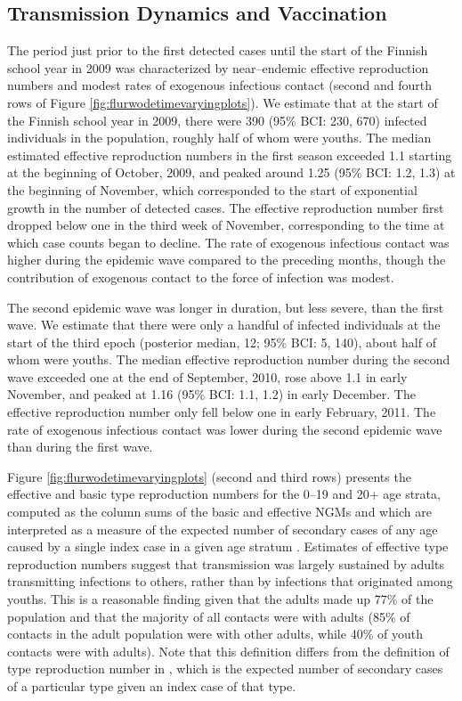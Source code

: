 \subsection{Transmission Dynamics and Vaccination}
\label{flu_res_dynamics}

The period just prior to the first detected cases until the start of the Finnish school year in 2009 was characterized by near--endemic effective reproduction numbers and modest rates of exogenous infectious contact (second and fourth rows of Figure \ref{fig:flurwodetimevaryingplots}). We estimate that at the start of the Finnish school year in 2009, there were 390 (95\% BCI: 230, 670) infected individuals in the population, roughly half of whom were youths. The median estimated effective reproduction numbers in the first season exceeded 1.1 starting at the beginning of October, 2009, and peaked around 1.25 (95\% BCI: 1.2, 1.3) at the beginning of November, which corresponded to the start of exponential growth in the number of detected cases. The effective reproduction number first dropped below one in the third week of November, corresponding to the time at which case counts began to decline. The rate of exogenous infectious contact was higher during the epidemic wave compared to the preceding months, though the contribution of exogenous contact to the force of infection was modest. 

The second epidemic wave was longer in duration, but less severe, than the first wave. We estimate that there were only a handful of infected individuals at the start of the third epoch (posterior median, 12; 95\% BCI: 5, 140), about half of whom were youths. The median effective reproduction number during the second wave exceeded one at the end of September, 2010, rose above 1.1 in early November, and peaked at 1.16 (95\% BCI: 1.1, 1.2) in early December. The effective reproduction number only fell below one in early February, 2011. The rate of exogenous infectious contact was lower during the second epidemic wave than during the first wave. 
 
Figure \ref{fig:flurwodetimevaryingplots} (second and third rows) presents the effective and basic type reproduction numbers for the 0--19 and 20+ age strata, computed as the column sums of the basic and effective NGMs and which are interpreted as a measure of the expected number of secondary cases of any age caused by a single index case in a given age stratum \cite{glass2011estimating}. Estimates of effective type reproduction numbers suggest that transmission was largely sustained by adults transmitting infections to others, rather than by infections that originated among youths. This is a reasonable finding given that the adults made up 77\% of the population and that the majority of all contacts were with adults (85\% of contacts in the adult population were with other adults, while 40\% of youth contacts were with adults). Note that this definition differs from the definition of type reproduction number in \cite{heesterbeek2007type}, which is the expected number of secondary cases of a particular type given an index case of that type. 

